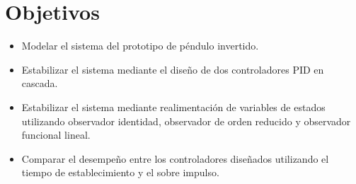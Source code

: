 \section{Objetivos}

\begin{itemize}
    \item Modelar el sistema del prototipo de péndulo invertido.
    
    \item Estabilizar el sistema mediante el diseño de dos controladores PID en cascada.
    
    \item Estabilizar el sistema mediante realimentación de variables de estados utilizando observador identidad, observador de orden reducido y observador funcional lineal.
    
    \item Comparar el desempeño entre los controladores diseñados utilizando el tiempo de establecimiento y el sobre impulso.
\end{itemize}
